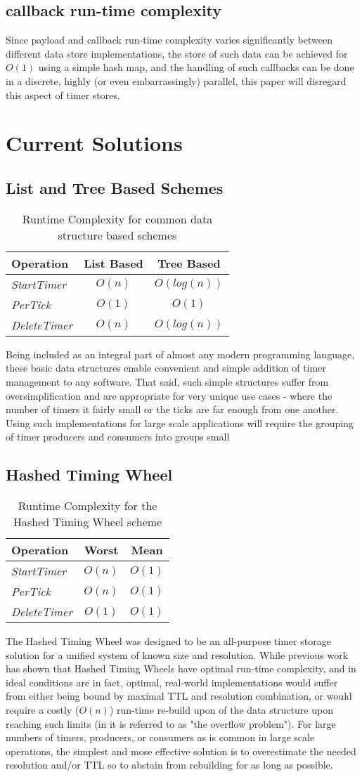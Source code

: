 \documentclass[conference]{IEEEtran}
\newcommand{\complexity}[9]{
\begin{table}[ht]
	\begin{center}
		\begin{tabular}{l|c|c}
			\textbf{Operation} & \textbf{#1} & \textbf{#2} \\
			\hline
			\textit{StartTimer} & $O(#3)$ & $O(#4)$ \\
			\textit{PerTick} & $O(#5)$ & $O(#6)$ \\
			\textit{DeleteTimer} &  $O(#7)$ & $O(#8)$ \\
		\end{tabular}
		\linebreak
		\caption{Runtime Complexity for #9}
	\end{center}
\end{table}
}
\begin{document}
\subsection{callback run-time complexity}

Since payload and callback run-time complexity varies significantly between different data store implementations, the store of such data can be achieved for $ O(1) $ using a simple hash map, and the handling of such callbacks can be done in a discrete, highly (or even embarrassingly) parallel, this paper will disregard this aspect of timer stores.


\section{Current Solutions}

\subsection{List and Tree Based Schemes}

\complexity{List Based}{Tree Based}{n}{log(n)}{1}{1}{n}{log(n)}{common data structure based schemes}

Being included as an integral part of almost any modern programming language, these basic data structures enable convenient and simple addition of timer management to any software. That said, such simple structures suffer from oversimplification and are appropriate for very unique use cases - where the number of timers it fairly small or the ticks are far enough from one another. Using such implementations for large scale applications will require the grouping of timer producers and consumers into groups small 



\subsection{Hashed Timing Wheel}
\complexity{Worst}{Mean}{n}{1}{n}{1}{1}{1}{the Hashed Timing Wheel scheme}
The Hashed Timing Wheel was designed to be an all-purpose timer storage solution for a unified system of known size and resolution\cite{TW87, TW, TWI, largescale, autoscale}. While previous work has shown that Hashed Timing Wheels have optimal run-time complexity, and in ideal conditions are in fact, optimal, real-world implementations would suffer from either being bound by maximal TTL and resolution combination, or would require a costly ($O(n)$) run-time re-build upon of the data structure upon reaching such limits (in \cite{CQ} it is referred to as "the overflow problem"). For large numbers of timers, producers, or consumers as is common in large scale operations, the simplest and mose effective solution is to overestimate the needed resolution and/or TTL so to abstain from rebuilding for as long as possible.
\end{document}
